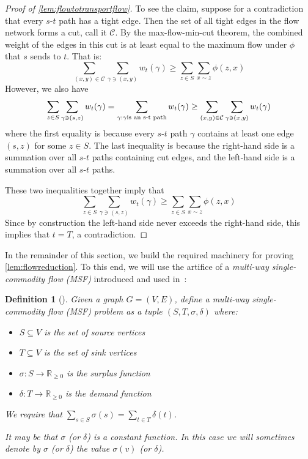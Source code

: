 \documentclass[a4paper, 12p]{article}
\numberwithin{equation}{section}
\newtheorem{definition}[theorem]{Definition}
\begin{document}
\begin{proof}[Proof of \cref{lem:flowtotransportflow}]
To see the claim, suppose for a contradiction that every $s$-$t$ path has a tight edge. Then the set of all tight edges in the flow network forms a cut, call it $\mathcal{C}$. By the max-flow-min-cut theorem, the combined weight of the edges in this cut is at least equal to the maximum flow under $\phi$ that $s$ sends to $t$. That is:
\[
    \sum_{(x, y) \in \mathcal{C}}\sum_{\gamma \ni (x, y)}w_t(\gamma) \geq \sum_{z \in S}\sum_{x \sim z}\phi(z, x)
\]
However, we also have
\[
    \sum_{z \in S}\sum_{\gamma \ni (s, z)}w_t(\gamma) = \sum_{\gamma: \gamma \textnormal{is an s-t path}}w_t(\gamma) \geq  \sum_{(x, y) \in \mathcal{C}}\sum_{\gamma \ni (x, y)}w_t(\gamma)
\]
where the first equality is because every $s$-$t$ path $\gamma$ contains at least one edge $(s, z)$ for some $z \in S$. The last inequality is because the right-hand side is a summation over all $s$-$t$ paths containing cut edges, and the left-hand side is a summation over all $s$-$t$ paths.

These two inequalities together imply that 
\[
    \sum_{z \in S}\sum_{\gamma \ni (s, z)}w_t(\gamma) \geq \sum_{z \in S}\sum_{x \sim z}\phi(z, x)
\]
Since by construction the left-hand side never exceeds the right-hand side, this
implies that $t = T$, a contradiction.
\end{proof}

In the remainder of this section, we build the required machinery for proving \cref{lem:flowreduction}.
To this end, we will use the artifice of a \emph{multi-way single-commodity flow (MSF)} introduced and used in~\cite{eppstein2022improved}:

\begin{definition}[\cite{eppstein2022improved}]
Given a graph $G = (V, E)$, define a \emph{multi-way single-commodity flow (MSF) problem} as a tuple
$(S, T, \sigma, \delta)$
where:
\begin{itemize}
    \item $S \subseteq V$ is the set of \emph{source} vertices
    \item $T \subseteq V$ is the set of \emph{sink} vertices
    \item $\sigma: S \rightarrow \mathbb{R}_{\geq 0}$ is the \emph{surplus} function
    \item $\delta: T \rightarrow \mathbb{R}_{\geq 0}$ is the \emph{demand} function
\end{itemize}
We require that 
$\sum_{s \in S} \sigma(s) = \sum_{t \in T} \delta(t)$.

It may be that $\sigma$ (or $\delta$) is a constant function. In this case we will sometimes denote by $\sigma$ (or $\delta$) the value $\sigma(v)$ (or $\delta$).
\label{def:msfproblem}
\end{definition}
\end{document}
